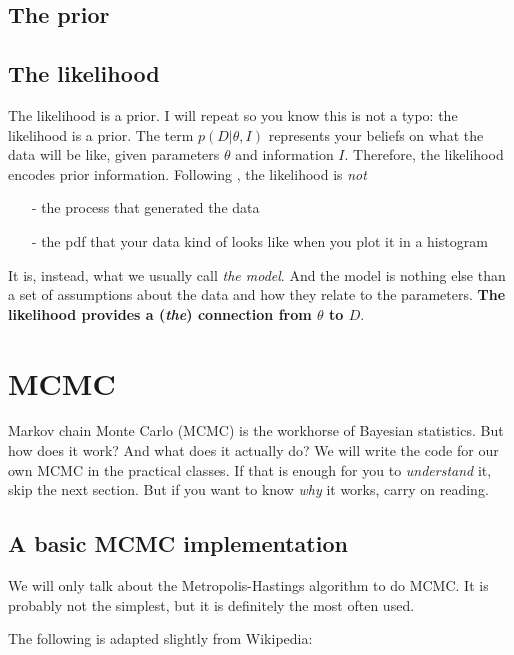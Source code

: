 \documentclass[a4paper,11pt]{article}
\begin{document}
\subsection{The prior}\label{sec:prior}

\subsection{The likelihood}\label{sec:likelihood}

The likelihood is a prior.
I will repeat so you know this is not a typo: the likelihood is a prior.
The term $p(D|\theta,I)$ represents your beliefs on what the data will be like, given parameters $\theta$ and information $I$.
Therefore, the likelihood encodes prior information.
%
Following \cite{Brewer2013}, the likelihood is \emph{not} 
\begin{itemize}
   \item[-] the process that generated the data
   \item[-] the pdf that your data kind of looks like when you plot it in a histogram
\end{itemize}

It is, instead, what we usually call \emph{the model}.
And the model is nothing else than a set of assumptions about the data and how they relate to the parameters.
\textbf{The likelihood provides a (\emph{the}) connection from $\theta$ to $D$}.




\section{MCMC}

Markov chain Monte Carlo (MCMC) is the workhorse of Bayesian statistics.
But how does it work? 
And what does it actually do?
We will write the code for our own MCMC in the practical classes.
If that is enough for you to \emph{understand} it, skip the next section.
But if you want to know \emph{why} it works, carry on reading.


\subsection{A basic MCMC implementation}

We will only talk about the Metropolis-Hastings algorithm to do MCMC.
It is probably not the simplest, but it is definitely the most often used.

\noindent The following is adapted slightly from Wikipedia:
\end{document}
